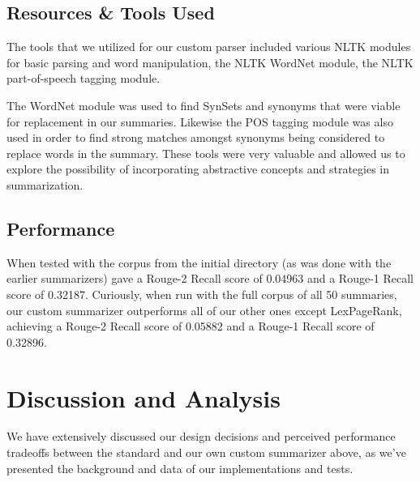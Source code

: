 \documentclass[11pt,letterpaper]{article}
\begin{document}
\subsection{Resources \& Tools Used}
The tools that we utilized for our custom parser included various NLTK modules for basic parsing and word manipulation, the NLTK WordNet module, the NLTK part-of-speech tagging module.

The WordNet module was used to find SynSets and synonyms that were viable for replacement in our summaries. Likewise the POS tagging module was also used in order to find strong matches amongst synonyms being considered to replace words in the summary. These tools were very valuable and allowed us to explore the possibility of incorporating abstractive concepts and strategies in summarization.

\subsection{Performance}
When tested with the corpus from the initial directory (as was done with the earlier summarizers) gave a Rouge-2 Recall score of 0.04963 and a Rouge-1 Recall score of 0.32187. Curiously, when run with the full corpus of all 50 summaries, our custom summarizer outperforms all of our other ones except LexPageRank, achieving a Rouge-2 Recall score of 0.05882 and a Rouge-1 Recall score of 0.32896.

\section{Discussion and Analysis}
We have extensively discussed our design decisions and perceived performance tradeoffs between the standard and our own custom summarizer above, as we've presented the background and data of our implementations and tests.
\end{document}
